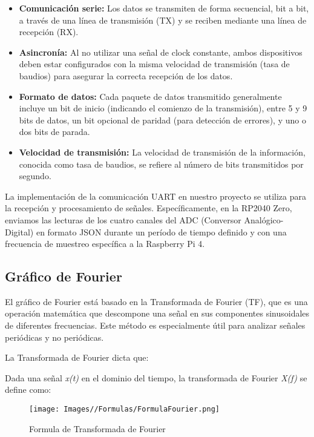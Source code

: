 \documentclass{article}
\begin{document}
\begin{itemize}
    \item \textbf{Comunicación serie:} Los datos se transmiten de forma secuencial, bit a bit, a través de una línea de transmisión (TX) y se reciben mediante una línea de recepción (RX).
    \item \textbf{Asincronía:} Al no utilizar una señal de clock constante, ambos dispositivos deben estar configurados con la misma velocidad de transmisión (tasa de baudios) para asegurar la correcta recepción de los datos.
    \item \textbf{Formato de datos:} Cada paquete de datos transmitido generalmente incluye un bit de inicio (indicando el comienzo de la transmisión), entre 5 y 9 bits de datos, un bit opcional de paridad (para detección de errores), y uno o dos bits de parada.
    \item \textbf{Velocidad de transmisión:} La velocidad de transmisión de la información, conocida como tasa de baudios, se refiere al número de bits transmitidos por segundo.
\end{itemize}

La implementación de la comunicación UART en nuestro proyecto se utiliza para la recepción y procesamiento de señales. Específicamente, en la RP2040 Zero, enviamos las lecturas de los cuatro canales del ADC (Conversor Analógico-Digital) en formato JSON durante un período de tiempo definido y con una frecuencia de muestreo específica a la Raspberry Pi 4.

\subsection{Gráfico de Fourier}
El gráfico de Fourier está basado en la Transformada de Fourier (TF), que es una operación matemática que descompone una señal en sus componentes sinusoidales de diferentes frecuencias. Este método es especialmente útil para analizar señales periódicas y no periódicas.

La Transformada de Fourier dicta que: 

Dada una señal \textit{x(t)} en el dominio del tiempo, la transformada de Fourier \textit{X(f)} se define como:

\begin{figure}[H]
    \centering
    \texttt{[image: Images//Formulas/FormulaFourier.png]}
    \caption{Formula de Transformada de Fourier}
    \label{fig:enter-label}
\end{figure}
\end{document}
